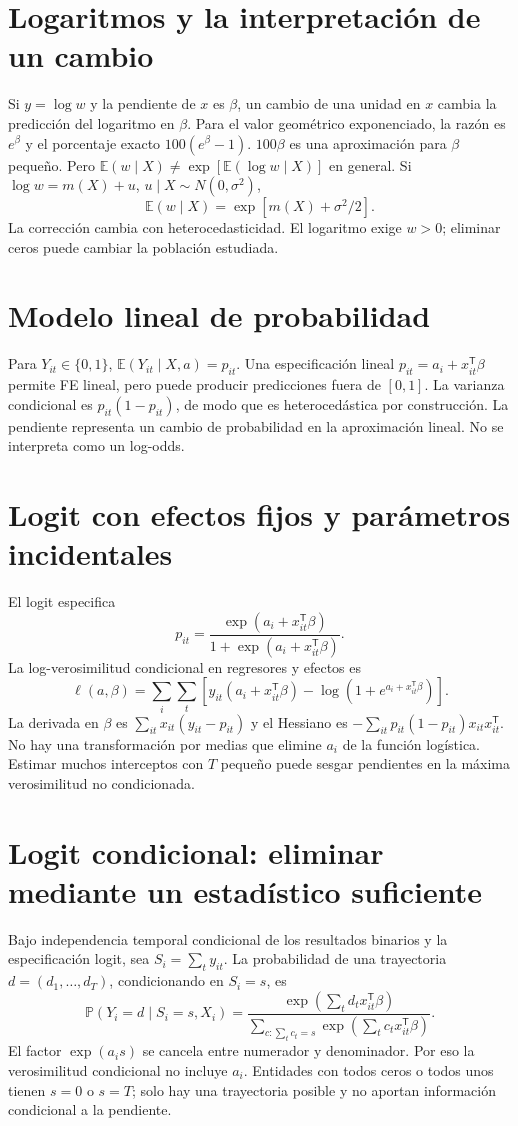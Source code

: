 \documentclass[11pt,a4paper]{article}
\newcommand{\E}{\mathbb E}
\newcommand{\Prob}{\mathbb P}
\newcommand{\T}{^{\mathsf T}}
\theoremstyle{definition}
\begin{document}
\section{Logaritmos y la interpretación de un cambio}
Si $y=\log w$ y la pendiente de $x$ es $\beta$, un cambio de una unidad en $x$ cambia la predicción del logaritmo en $\beta$.
Para el valor geométrico exponenciado, la razón es $e^\beta$ y el porcentaje exacto $100(e^\beta-1)$.
$100\beta$ es una aproximación para $\beta$ pequeño.
Pero
$\E(w\mid X)\ne\exp[\E(\log w\mid X)]$ en general.
Si $\log w=m(X)+u$, $u\mid X\sim N(0,\sigma^2)$,
\[
\E(w\mid X)=\exp[m(X)+\sigma^2/2].
\]
La corrección cambia con heterocedasticidad.
El logaritmo exige $w>0$; eliminar ceros puede cambiar la población estudiada.

\section{Modelo lineal de probabilidad}
Para $Y_{it}\in\{0,1\}$, $\E(Y_{it}\mid X,a)=p_{it}$.
Una especificación lineal $p_{it}=a_i+x_{it}\T\beta$ permite FE lineal, pero puede producir predicciones fuera de $[0,1]$.
La varianza condicional es $p_{it}(1-p_{it})$, de modo que es heterocedástica por construcción.
La pendiente representa un cambio de probabilidad en la aproximación lineal. No se interpreta como un log-odds.

\section{Logit con efectos fijos y parámetros incidentales}
El logit especifica
\[
p_{it}=\frac{\exp(a_i+x_{it}\T\beta)}{1+\exp(a_i+x_{it}\T\beta)}.
\]
La log-verosimilitud condicional en regresores y efectos es
\[
\ell(a,\beta)=\sum_i\sum_t
[y_{it}(a_i+x_{it}\T\beta)-\log(1+e^{a_i+x_{it}\T\beta})].
\]
La derivada en $\beta$ es $\sum_{it}x_{it}(y_{it}-p_{it})$ y el Hessiano es
$-\sum_{it}p_{it}(1-p_{it})x_{it}x_{it}\T$.
No hay una transformación por medias que elimine $a_i$ de la función logística.
Estimar muchos interceptos con $T$ pequeño puede sesgar pendientes en la máxima verosimilitud no condicionada.

\section{Logit condicional: eliminar mediante un estadístico suficiente}
Bajo independencia temporal condicional de los resultados binarios y la especificación logit, sea $S_i=\sum_ty_{it}$.
La probabilidad de una trayectoria $d=(d_1,\ldots,d_T)$, condicionando en $S_i=s$, es
\[
\Prob(Y_i=d\mid S_i=s,X_i)
=\frac{\exp(\sum_td_tx_{it}\T\beta)}
{\sum_{c:\sum_tc_t=s}\exp(\sum_tc_tx_{it}\T\beta)}.
\]
El factor $\exp(a_i s)$ se cancela entre numerador y denominador.
Por eso la verosimilitud condicional no incluye $a_i$.
Entidades con todos ceros o todos unos tienen $s=0$ o $s=T$; solo hay una trayectoria posible y no aportan información condicional a la pendiente.
\end{document}
